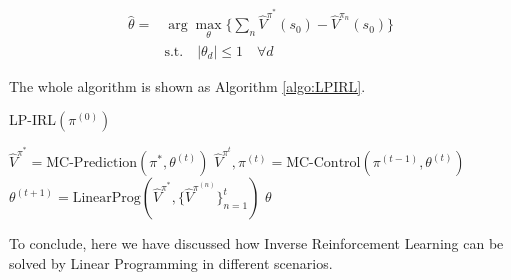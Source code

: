 \documentclass[11pt]{article}
\begin{document}
\begin{equation*}
\begin{aligned}
\hat{\theta} = & \arg \max_\theta \{ \sum_{n} \hat{V}^{\pi^*}(s_0) - \hat{V}^{\pi_n}(s_0) \} \\
& \text{s.t.} \quad |\theta_d| \leq 1 \quad \forall{d}
\end{aligned}
\end{equation*}

The whole algorithm is shown as Algorithm \ref{algo:LPIRL}.

\begin{algorithm}[H]
\caption{LP-IRL$(\pi^{(0)})$}
\label{algo:LPIRL}
\begin{algorithmic}[1]
\STATE $\hat{V}^{\pi^*} = \text{MC-Prediction} (\pi^*,\theta^{(t)})$
\STATE $\hat{V}^{\pi^t}, \pi^{(t)} = \text{MC-Control} (\pi^{(t-1)},\theta^{(t)})$
\STATE $\theta^{(t+1)} = \text{LinearProg} (\hat{V}^{\pi^*},\{\hat{V}^{\pi^{(n)}} \}_{n=1}^{t})$
\ENDFOR 
\RETURN $\theta$
\end{algorithmic}
\end{algorithm}

To conclude, here we have discussed how Inverse Reinforcement Learning can be solved by Linear Programming in different scenarios.


{


}







\end{document}
